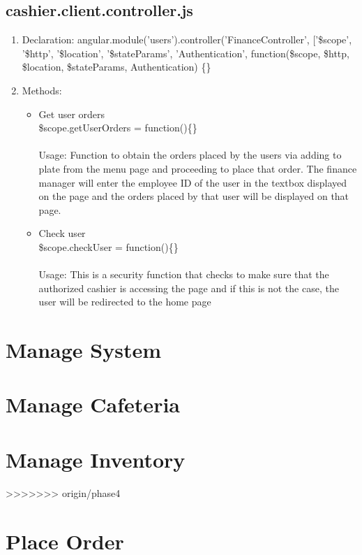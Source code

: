 \documentclass[a4paper,12pt]{article}
\begin{document}
\subsection{cashier.client.controller.js}
\begin{enumerate}
\item Declaration: angular.module('users').controller('FinanceController', ['\$scope', '\$http', '\$location', '\$stateParams', 'Authentication',
    function(\$scope, \$http, \$location, \$stateParams, Authentication) \{\}
\item Methods:
	\begin{itemize}
		\item  Get user orders \\  \$scope.getUserOrders = function()\{\}
		\\ \\ Usage: Function to obtain the orders placed by the users via adding to plate from the menu page and proceeding to place that order. The finance manager will enter the employee ID of the user in the textbox displayed on the page and the orders placed by that user will be displayed on that page.
		\item Check user \\ \$scope.checkUser = function()\{\}
	\\ \\ Usage: This is a security function that checks to make sure that the authorized cashier is accessing the page and if this is not the case, the user will be redirected to the home page
	\end{itemize}	
\end{enumerate}
\section{Manage System}
\section{Manage Cafeteria}
\section{Manage Inventory}
>>>>>>> origin/phase4
\section{Place Order}
\end{document}

